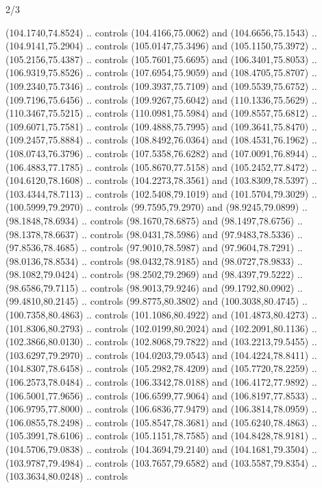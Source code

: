 \begin{flagdescription}{2/3}
\begin{scope}[shift={(0.5\flaglength,0.5)},scale=\flagwidth/320]
\begin{scope}[y=0.8pt, x=0.8pt, yscale=-1,shift={(-118.3,-146)}]
\path[fill=red,line width=0.253\lw] %
  (104.1740,74.8524) .. controls
  (104.4166,75.0062) and (104.6656,75.1543) .. (104.9141,75.2904) .. controls
  (105.0147,75.3496) and (105.1150,75.3972) .. (105.2156,75.4387) .. controls
  (105.7601,75.6695) and (106.3401,75.8053) .. (106.9319,75.8526) .. controls
  (107.6954,75.9059) and (108.4705,75.8707) .. (109.2340,75.7346) .. controls
  (109.3937,75.7109) and (109.5539,75.6752) .. (109.7196,75.6456) .. controls
  (109.9267,75.6042) and (110.1336,75.5629) .. (110.3467,75.5215) .. controls
  (110.0981,75.5984) and (109.8557,75.6812) .. (109.6071,75.7581) .. controls
  (109.4888,75.7995) and (109.3641,75.8470) .. (109.2457,75.8884) .. controls
  (108.8492,76.0364) and (108.4531,76.1962) .. (108.0743,76.3796) .. controls
  (107.5358,76.6282) and (107.0091,76.8944) .. (106.4883,77.1785) .. controls
  (105.8670,77.5158) and (105.2452,77.8472) .. (104.6120,78.1608) .. controls
  (104.2273,78.3561) and (103.8309,78.5397) .. (103.4344,78.7113) .. controls
  (102.5408,79.1019) and (101.5704,79.3029) .. (100.5999,79.2970) .. controls
  (99.7595,79.2970) and (98.9245,79.0899) .. (98.1848,78.6934) .. controls
  (98.1670,78.6875) and (98.1497,78.6756) .. (98.1378,78.6637) .. controls
  (98.0431,78.5986) and (97.9483,78.5336) .. (97.8536,78.4685) .. controls
  (97.9010,78.5987) and (97.9604,78.7291) .. (98.0136,78.8534) .. controls
  (98.0432,78.9185) and (98.0727,78.9833) .. (98.1082,79.0424) .. controls
  (98.2502,79.2969) and (98.4397,79.5222) .. (98.6586,79.7115) .. controls
  (98.9013,79.9246) and (99.1792,80.0902) .. (99.4810,80.2145) .. controls
  (99.8775,80.3802) and (100.3038,80.4745) .. (100.7358,80.4863) .. controls
  (101.1086,80.4922) and (101.4873,80.4273) .. (101.8306,80.2793) .. controls
  (102.0199,80.2024) and (102.2091,80.1136) .. (102.3866,80.0130) .. controls
  (102.8068,79.7822) and (103.2213,79.5455) .. (103.6297,79.2970) .. controls
  (104.0203,79.0543) and (104.4224,78.8411) .. (104.8307,78.6458) .. controls
  (105.2982,78.4209) and (105.7720,78.2259) .. (106.2573,78.0484) .. controls
  (106.3342,78.0188) and (106.4172,77.9892) .. (106.5001,77.9656) .. controls
  (106.6599,77.9064) and (106.8197,77.8533) .. (106.9795,77.8000) .. controls
  (106.6836,77.9479) and (106.3814,78.0959) .. (106.0855,78.2498) .. controls
  (105.8547,78.3681) and (105.6240,78.4863) .. (105.3991,78.6106) .. controls
  (105.1151,78.7585) and (104.8428,78.9181) .. (104.5706,79.0838) .. controls
  (104.3694,79.2140) and (104.1681,79.3504) .. (103.9787,79.4984) .. controls
  (103.7657,79.6582) and (103.5587,79.8354) .. (103.3634,80.0248) .. controls

\end{scope}
\end{scope}
\end{flagdescription}
